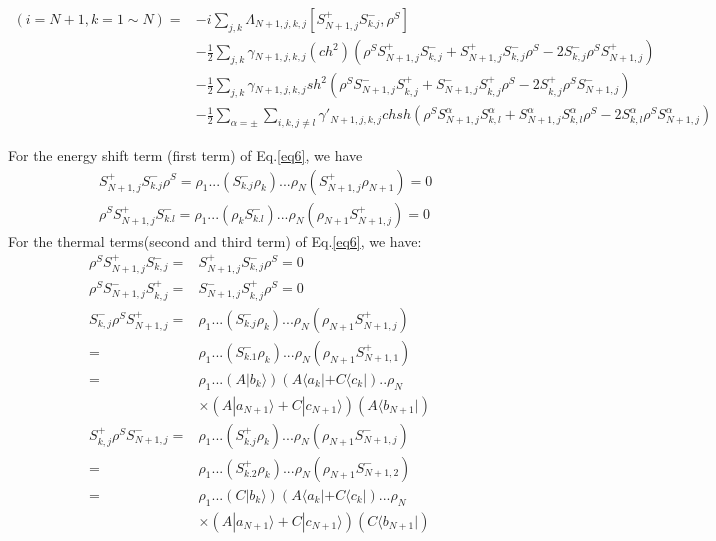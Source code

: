 \documentclass[aps,showpacs,twocolumn,twoside,groupedaddress]{revtex4}
\begin{document}
\begin{widetext}
\begin{equation}
\label{eq6}
\begin{split}
(i=N+1, k=1\sim N)=&-i\underset{j,k}{\sum}\Lambda_{N+1,j,k,j}[S_{N+1,j}^{+}S_{k.j}^{-},\rho^{S}]\\
&-\frac{1}{2}\underset{j,k}{\sum}\gamma{}_{N+1,j,k,j}(ch^{2})(\rho^{S}S_{N+1,j}^{+}S_{k,j}^{-}+S_{N+1,j}^{+}S_{k,j}^{-}\rho^{S}-2S_{k,j}^{-}\rho^{S}S_{N+1,j}^{+})\\
&-\frac{1}{2}\underset{j,k}{\sum}\gamma{}_{N+1,j,k,j}sh^{2}(\rho^{S}S_{N+1,j}^{-}S_{k,j}^{+}+S_{N+1,j}^{-}S_{k,j}^{+}\rho^{S}-2S_{k,j}^{+}\rho^{S}S_{N+1,j}^{-})\\
&-\frac{1}{2}\sum_{\alpha=\pm}\underset{i,k,j\ne l}{\sum}\gamma'_{N+1,j,k,j}chsh(\rho^{S}S_{N+1,j}^{\alpha}S_{k,l}^{\alpha}+S_{N+1,j}^{\alpha}S_{k,l}^{\alpha}\rho^{S}-2S_{k,l}^{\alpha}\rho^{S}S_{N+1,j}^{\alpha})
\end{split}
\end{equation}
\end{widetext}
For the energy shift term (first term) of Eq.\eqref{eq6}, we have 
\begin{equation}
\label{eq7}
\begin{split}
&S_{N+1,j}^{+}S_{k.j}^{-}\rho^{S}=\rho_{1}...(S_{k.j}^{-}\rho_{k})...\rho_{N}(S_{N+1,j}^{+}\rho_{N+1})=0\\
&\rho^{S}S_{N+1,j}^{+}S_{k.l}^{-}=\rho_{1}...(\rho_{k}S_{k.l}^{-})...\rho_{N}(\rho_{N+1}S_{N+1,j}^{+})=0
\end{split}
\end{equation}
For the thermal terms(second and third term) of Eq.\eqref{eq6}, we have:
\begin{equation}
\label{eq8}
\begin{split}
\rho^{S}S_{N+1,j}^{+}S_{k,j}^{-}=&S_{N+1,j}^{+}S_{k,j}^{-}\rho^{S}=0\\
\rho^{S}S_{N+1,j}^{-}S_{k,j}^{+}=&S_{N+1,j}^{-}S_{k,j}^{+}\rho^{S}=0\\
S_{k,j}^{-}\rho^{S}S_{N+1,j}^{+}=&\rho_{1}...(S_{k.j}^{-}\rho_{k})...\rho_{N}(\rho_{N+1}S_{N+1,j}^{+})\\
=&\rho_{1}...(S_{k.1}^{-}\rho_{k})...\rho_{N}(\rho_{N+1}S_{N+1,1}^{+})\\
=&\rho_{1}...(A|b_{k}\rangle)(A\langle a_{k}|+C\langle c_{k}|)..\rho_{N}\\
&\times(A|a_{N+1}\rangle+C|c_{N+1}\rangle)(A\langle b_{N+1}|)\\
S_{k,j}^{+}\rho^{S}S_{N+1,j}^{-}=&\rho_{1}...(S_{k.j}^{+}\rho_{k})...\rho_{N}(\rho_{N+1}S_{N+1,j}^{-})\\
=&\rho_{1}...(S_{k.2}^{+}\rho_{k})...\rho_{N}(\rho_{N+1}S_{N+1,2}^{-})\\
=&\rho_{1}...(C|b_{k}\rangle)(A\langle a_{k}|+C\langle c_{k}|)...\rho_{N}\\
&\times (A|a_{N+1}\rangle+C|c_{N+1}\rangle)(C\langle b_{N+1}|)
\end{split}
\end{equation}
\end{document}

